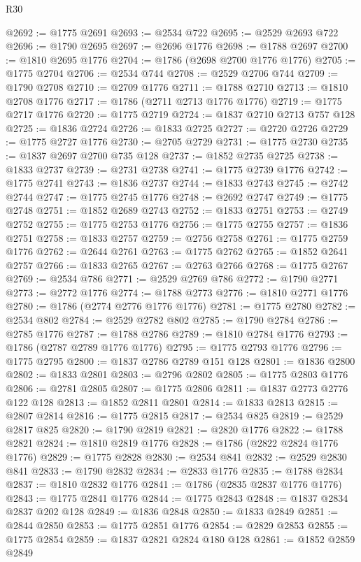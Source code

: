 \begin{lexlean}{R30}
\begin{coremodule}
@2692 := @1775 @2691
@2693 := @2534 @722
@2695 := @2529 @2693 @722
@2696 := @1790 @2695
@2697 := @2696 @1776
@2698 := @1788 @2697
@2700 := @1810 @2695 @1776
@2704 := @1786 (@2698 @2700 @1776 @1776)
@2705 := @1775 @2704
@2706 := @2534 @744
@2708 := @2529 @2706 @744
@2709 := @1790 @2708
@2710 := @2709 @1776
@2711 := @1788 @2710
@2713 := @1810 @2708 @1776
@2717 := @1786 (@2711 @2713 @1776 @1776)
@2719 := @1775 @2717 @1776
@2720 := @1775 @2719
@2724 := @1837 @2710 @2713 @757 @128
@2725 := @1836 @2724
@2726 := @1833 @2725
@2727 := @2720 @2726
@2729 := @1775 @2727 @1776
@2730 := @2705 @2729
@2731 := @1775 @2730
@2735 := @1837 @2697 @2700 @735 @128
@2737 := @1852 @2735 @2725
@2738 := @1833 @2737
@2739 := @2731 @2738
@2741 := @1775 @2739 @1776
@2742 := @1775 @2741
@2743 := @1836 @2737
@2744 := @1833 @2743
@2745 := @2742 @2744
@2747 := @1775 @2745 @1776
@2748 := @2692 @2747
@2749 := @1775 @2748
@2751 := @1852 @2689 @2743
@2752 := @1833 @2751
@2753 := @2749 @2752
@2755 := @1775 @2753 @1776
@2756 := @1775 @2755
@2757 := @1836 @2751
@2758 := @1833 @2757
@2759 := @2756 @2758
@2761 := @1775 @2759 @1776
@2762 := @2644 @2761
@2763 := @1775 @2762
@2765 := @1852 @2641 @2757
@2766 := @1833 @2765
@2767 := @2763 @2766
@2768 := @1775 @2767
@2769 := @2534 @786
@2771 := @2529 @2769 @786
@2772 := @1790 @2771
@2773 := @2772 @1776
@2774 := @1788 @2773
@2776 := @1810 @2771 @1776
@2780 := @1786 (@2774 @2776 @1776 @1776)
@2781 := @1775 @2780
@2782 := @2534 @802
@2784 := @2529 @2782 @802
@2785 := @1790 @2784
@2786 := @2785 @1776
@2787 := @1788 @2786
@2789 := @1810 @2784 @1776
@2793 := @1786 (@2787 @2789 @1776 @1776)
@2795 := @1775 @2793 @1776
@2796 := @1775 @2795
@2800 := @1837 @2786 @2789 @151 @128
@2801 := @1836 @2800
@2802 := @1833 @2801
@2803 := @2796 @2802
@2805 := @1775 @2803 @1776
@2806 := @2781 @2805
@2807 := @1775 @2806
@2811 := @1837 @2773 @2776 @122 @128
@2813 := @1852 @2811 @2801
@2814 := @1833 @2813
@2815 := @2807 @2814
@2816 := @1775 @2815
@2817 := @2534 @825
@2819 := @2529 @2817 @825
@2820 := @1790 @2819
@2821 := @2820 @1776
@2822 := @1788 @2821
@2824 := @1810 @2819 @1776
@2828 := @1786 (@2822 @2824 @1776 @1776)
@2829 := @1775 @2828
@2830 := @2534 @841
@2832 := @2529 @2830 @841
@2833 := @1790 @2832
@2834 := @2833 @1776
@2835 := @1788 @2834
@2837 := @1810 @2832 @1776
@2841 := @1786 (@2835 @2837 @1776 @1776)
@2843 := @1775 @2841 @1776
@2844 := @1775 @2843
@2848 := @1837 @2834 @2837 @202 @128
@2849 := @1836 @2848
@2850 := @1833 @2849
@2851 := @2844 @2850
@2853 := @1775 @2851 @1776
@2854 := @2829 @2853
@2855 := @1775 @2854
@2859 := @1837 @2821 @2824 @180 @128
@2861 := @1852 @2859 @2849

\end{coremodule}
\end{lexlean}
